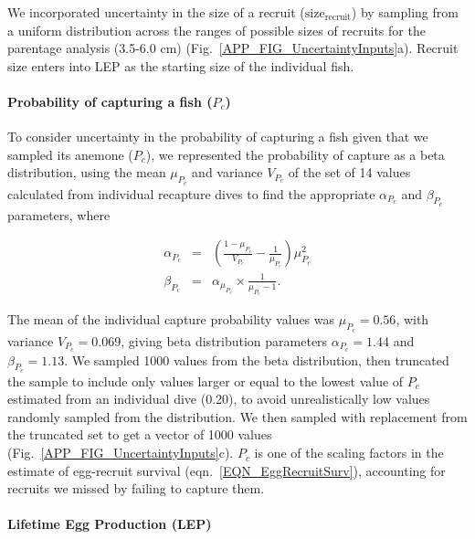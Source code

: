 \documentclass[12pt, oneside]{article}   	%
\begin{document}
We incorporated uncertainty in the size of a recruit ($\text{size}_\text{recruit}$) by sampling from a uniform distribution across the ranges of possible sizes of recruits for the parentage analysis (3.5-6.0 cm) (Fig.\ \ref{APP_FIG_UncertaintyInputs}a). Recruit size enters into LEP as the starting size of the individual fish.

\paragraph{Probability of capturing a fish ($P_c$)} \label{APP_SEC_Uncertainty_Pc}

To consider uncertainty in the probability of capturing a fish given that we sampled its anemone ($P_c$), we represented the probability of capture as a beta distribution, using the mean $\mu_{P_c}$ and variance $V_{P_c}$ of the set of 14 values calculated from individual recapture dives to find the appropriate $\alpha_{P_c}$ and $\beta_{P_c}$ parameters, where 

\begin{eqnarray}
\alpha_{P_c} &=& (\frac{1-\mu_{P_c}}{V_{P_c}} - \frac{1}{\mu_{P_c}}) \mu_{P_c}^2 \\
\beta_{P_c} &=& \alpha_{\mu_{P_c}} \times \frac{1}{\mu_{P_c} - 1}. \label{APP_EQN_ProbCapBetaDistParams}  %
\end{eqnarray}

The mean of the individual capture probability values was $\mu_{P_c} = 0.56$, with variance $V_{P_c} = 0.069$, giving beta distribution parameters $\alpha_{P_c} = 1.44$ and $\beta_{P_c} = 1.13$. We sampled 1000 values from the beta distribution, then truncated the sample to include only values larger or equal to the lowest value of $P_c$ estimated from an individual dive (0.20), to avoid unrealistically low values randomly sampled from the distribution. We then sampled with replacement from the truncated set to get a vector of 1000 values (Fig.\ \ref{APP_FIG_UncertaintyInputs}c). $P_c$ is one of the scaling factors in the estimate of egg-recruit survival (eqn.\ \ref{EQN_EggRecruitSurv}), accounting for recruits we missed by failing to capture them.

\paragraph{Lifetime Egg Production (LEP)} \label{APP_SEC_Uncertainty_LEP}
\end{document}
